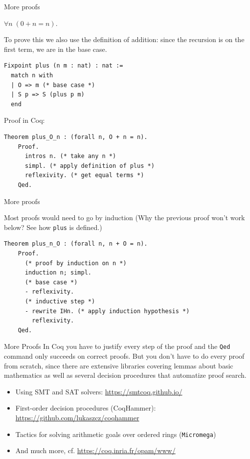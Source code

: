 \documentclass[10pt]{beamer}
\begin{document}
\begin{frame}[fragile]{More proofs}
\begin{theorem} $\forall n \; (0 + n = n)$.
\end{theorem}

To prove this we also use the definition of addition: since the recursion is on the first term, we are in the base case.

   \begin{lstlisting}[language=Coq]
  Fixpoint plus (n m : nat) : nat :=
  match n with
  | O => m (* base case *)
  | S p => S (plus p m)
  end
   \end{lstlisting}

   Proof in Coq:

  \begin{lstlisting}[language=Coq]
    Theorem plus_O_n : (forall n, O + n = n).
    Proof.
      intros n. (* take any n *)
      simpl. (* apply definition of plus *)
      reflexivity. (* get equal terms *)
    Qed.
  \end{lstlisting}

 
\end{frame}



\begin{frame}[fragile]{More proofs}

  Most proofs would need to go by induction (Why the previous proof won't work below? See how \texttt{plus} is defined.)

  \begin{lstlisting}[language=Coq]
    Theorem plus_n_O : (forall n, n + O = n).
    Proof.
      (* proof by induction on n *)
      induction n; simpl.
      (* base case *)
      - reflexivity.
      (* inductive step *)
      - rewrite IHn. (* apply induction hypothesis *)
        reflexivity.
    Qed.

  \end{lstlisting}
\end{frame}
\begin{frame}{More Proofs}
     In Coq you have to justify every step of the proof and the \texttt{Qed} command only succeeds on correct proofs. But you don't have to do every proof from scratch, since there are extensive libraries covering lemmas about basic mathematics as well as several decision procedures that automatize proof search.
     \begin{itemize}
     \item Using SMT and SAT solvers: \url{https://smtcoq.github.io/}
     \item First-order decision procedures (CoqHammer): \url{https://github.com/lukaszcz/coqhammer}
     \item Tactics for solving arithmetic goals over ordered rings (\texttt{Micromega})
       \item And much more, cf. \url{https://coq.inria.fr/opam/www/}
       \end{itemize}
  
\end{frame}
\end{document}

